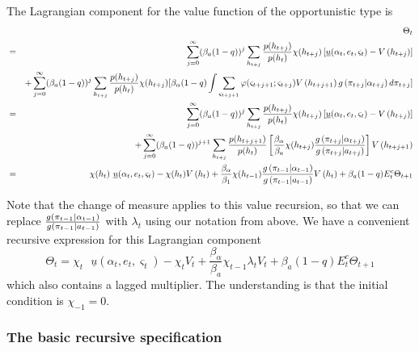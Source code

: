 \documentclass[12pt,letter,leqno]{article}
\theoremstyle{asn}
\theoremstyle{lem}
\theoremstyle{slem}
\theoremstyle{prop}
\theoremstyle{appprop}
\theoremstyle{rem}
\theoremstyle{defn}
\begin{document}
\begin{oldversion}
The Lagrangian component for the value function of the opportunistic type is%
\begin{eqnarray*}
&&\Theta _{t} \\
&=&\sum_{j=0}^{\infty }(\beta_{a}(1-q))^{j}\sum_{h_{t+j}}\frac{p(h_{t+j})}{%
p(h_{t})}\chi (h_{t+j})\left[ \underline{u}(\alpha _{t},e_{t},\varsigma
_{t})-V\left( h_{t+j}\right) \right] \\
&&+\sum_{j=0}^{\infty }(\beta_{a}(1-q))^{j}\sum_{h_{t+j}}\frac{p(h_{t+j})}{%
p(h_{t})}\chi (h_{t+j})[\beta_{\alpha}(1-q)\int \sum_{\varsigma
_{t+j+1}}\varphi (\varsigma _{t+j+1};\varsigma _{t+j})V\left(
h_{t+j+1}\right) g\left( \pi _{t+j}|\alpha _{t+j}\right) d\pi
_{t+j}] \\
&=&\sum_{j=0}^{\infty }(\beta_{a}(1-q))^{j}\sum_{h_{t+j}}\frac{p(h_{t+j})}{%
p(h_{t})}\chi (h_{t+j})\left[ \underline{u}(\alpha _{t},e_{t},\varsigma
_{t})-V\left( h_{t+j}\right) \right] \\
&&+\sum_{j=0}^{\infty }(\beta_{a}(1-q))^{j+1}\sum_{h_{t+j}}\frac{%
p(h_{t+j+1})}{p(h_{t})}\left[ \frac{\beta_{\alpha}}{%
\beta_{a}}\chi (h_{t+j})\frac{g\left( \pi _{t+j}|\alpha
_{t+j}\right) }{g\left( \pi _{t+j}|a_{t+j}\right) }\right] V%
\left( h_{t+j+1}\right) \\
&=&\chi (h_{t})\text{ }\underline{u}(\alpha _{t},e_{t},\varsigma _{t})-\chi (h_{t})V\left( h_{t}\right) +\frac{\beta_{\alpha}}{\beta
_{1}}\chi (h_{t-1})\frac{g\left( \pi _{t-1}|\alpha
_{t-1}\right) }{g\left( \pi _{t-1}|a_{t-1}\right) }V\left( h_{t}\right)
+\beta_{a}(1-q)E_{t}^{c}\Theta _{t+1}
\end{eqnarray*}

Note that the change of measure applies to this value recursion, so that we
can replace $\frac{g\left( \pi _{t-1}|\alpha _{t-1}\right) }{%
g\left( \pi _{t-1}|a_{t-1}\right) }$ with $\lambda _{t}$ using our notation
from above. We have a convenient recursive expression for this Lagrangian
component 
\begin{equation}
\Theta _{t}=\chi _{t}\text{ }\underline{u}(\alpha _{t},e_{t},\varsigma
_{t})-\chi _{t}V_{t}+\frac{\beta_{\alpha}}{\beta_{a}}\chi
_{t-1}\lambda _{t}V_{t}+\beta_{a}(1-q)E_{t}^{c}\Theta _{t+1}
\label{THETArecursive}
\end{equation}%
which also contains a lagged multiplier. The understanding is that the
initial condition is $\chi _{-1}=0$.

\subsubsection{The basic recursive specification}
\label{appsec:recursive8}


\end{oldversion}
\end{document}
